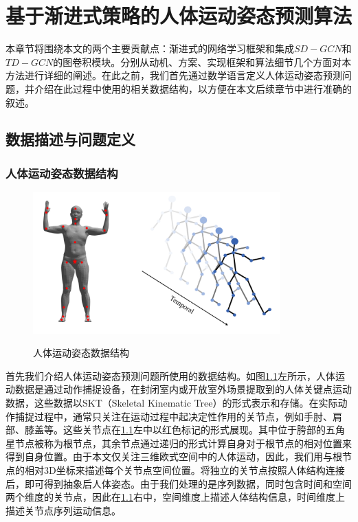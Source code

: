 
\chapter{基于渐进式策略的人体运动姿态预测算法}
本章节将围绕本文的两个主要贡献点：渐进式的网络学习框架和集成$SD-GCN$和$TD-GCN$的图卷积模块。分别从动机、方案、实现框架和算法细节几个方面对本方法进行详细的阐述。在此之前，我们首先通过数学语言定义人体运动姿态预测问题，并介绍在此过程中使用的相关数据结构，以方便在本文后续章节中进行准确的叙述。
\section{数据描述与问题定义}
\subsection{人体运动姿态数据结构}
\begin{figure}[ht]
    \centering
    \includegraphics[width=0.85\textwidth]{FigMa/show_structure.png}\\
    \vspace{-0.3cm}
    \caption{人体运动姿态数据结构}
    \label{fig:data_structure}
\end{figure}
首先我们介绍人体运动姿态预测问题所使用的数据结构。如图\ref{fig:data_structure}左所示，人体运动数据是通过动作捕捉设备，在封闭室内或开放室外场景提取到的人体关键点运动数据，这些数据以SKT（Skeletal Kinematic Tree）的形式表示和存储。在实际动作捕捉过程中，通常只关注在运动过程中起决定性作用的关节点，例如手肘、肩部、膝盖等。这些关节点在\ref{fig:data_structure}左中以红色标记的形式展现。其中位于胯部的五角星节点被称为根节点，其余节点通过递归的形式计算自身对于根节点的相对位置来得到自身位置。由于本文仅关注三维欧式空间中的人体运动，因此，我们用与根节点的相对3D坐标来描述每个关节点空间位置。将独立的关节点按照人体结构连接后，即可得到抽象后人体姿态。由于我们处理的是序列数据，同时包含时间和空间两个维度的关节点，因此在\ref{fig:data_structure}右中，空间维度上描述人体结构信息，时间维度上描述关节点序列运动信息。

